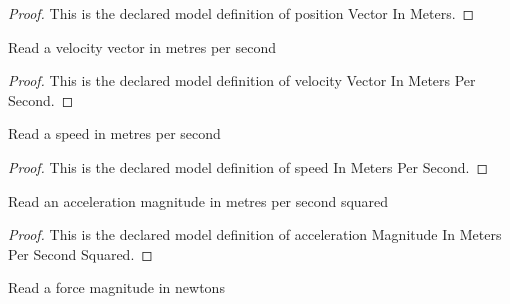 \begin{proof}
  This is the declared model definition of position Vector In Meters.
\end{proof}
\begin{definition}
  \label{def:physics:phyx-mini-0958:phyxminiproblems-problemphyxmini0958-velocityvectorinmeterspersecond}
  Read a velocity vector in metres per second
\end{definition}
\begin{proof}
  This is the declared model definition of velocity Vector In Meters Per Second.
\end{proof}
\begin{definition}
  \label{def:physics:phyx-mini-0958:phyxminiproblems-problemphyxmini0958-speedinmeterspersecond}
  Read a speed in metres per second
\end{definition}
\begin{proof}
  This is the declared model definition of speed In Meters Per Second.
\end{proof}
\begin{definition}
  \label{def:physics:phyx-mini-0958:phyxminiproblems-problemphyxmini0958-accelerationmagnitudeinmeterspersecondsquared}
  Read an acceleration magnitude in metres per second squared
\end{definition}
\begin{proof}
  This is the declared model definition of acceleration Magnitude In Meters Per Second Squared.
\end{proof}
\begin{definition}
  \label{def:physics:phyx-mini-0958:phyxminiproblems-problemphyxmini0958-forcemagnitudeinnewtons}
  Read a force magnitude in newtons
\end{definition}
